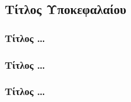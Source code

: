 \subsection{Τίτλος Υποκεφαλαίου}

\bigskip

\subsubsection{Τίτλος \ldots}

\bigskip

\subsubsection{Τίτλος \ldots}

\bigskip

\subsubsection{Τίτλος \ldots}

\bigskip
